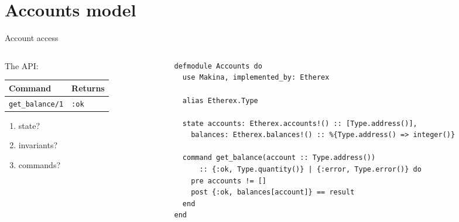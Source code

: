 \documentclass[aspectratio=169, 10pt]{beamer}
\begin{document}
\section{Accounts model}
\label{sec:orgefa798e}

\begin{frame}[label={sec:org3b2707c},fragile]{Account access}
 \begin{columns}
\begin{column}{0.28\columnwidth}
The API:

\begin{center}
\begin{tabular}{ll}
Command & Returns\\
\hline
\texttt{get\_balance/1} & \texttt{:ok}\\
\end{tabular}
\end{center}

\vspace{0.5cm}

\begin{enumerate}
\item state?
\item invariants?
\item commands?
\end{enumerate}
\end{column}

\begin{column}{0.68\columnwidth}
\lstset{language=elixir,label= ,caption= ,captionpos=b,numbers=none,style=display}
\begin{lstlisting}
defmodule Accounts do
  use Makina, implemented_by: Etherex

  alias Etherex.Type

  state accounts: Etherex.accounts!() :: [Type.address()],
	balances: Etherex.balances!() :: %{Type.address() => integer()}

  command get_balance(account :: Type.address())
      :: {:ok, Type.quantity()} | {:error, Type.error()} do
    pre accounts != []
    post {:ok, balances[account]} == result
  end
end
\end{lstlisting}
\end{column}
\end{columns}
\end{frame}
\end{document}
